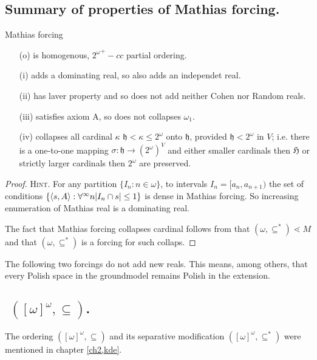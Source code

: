 \subsection{${}$Summary of properties of Mathias forcing.}

Mathias forcing
\begin{itemize}
 \item[(o)] is homogenous, ${2^\omega}^+-cc$ partial ordering.
 \item[(i)] adds a dominating real, so also adds an independet real.
 \item[(ii)] has laver property and so does not add neither Cohen
	nor Random reals.
 \item[(iii)] satisfies axiom A, so does not collapses $\omega_1$.
 \item[(iv)] collapses all cardinal $\kappa$ $\mathfrak h < \kappa \leq 2^\omega$
	onto $\mathfrak h$, provided $\mathfrak h < 2^\omega$ in $V$;
	i.e. there is a one-to-one mapping $\sigma: \mathfrak h \to (2^\omega)^V$
	and either smaller cardinals then $\mathfrak H$ or strictly
	larger cardinals then $2^\omega$ are preserved.
\end{itemize}

\begin{proof} {\scshape Hint.} For any  partition $\{I_n : n \in \omega \}$, to
intervals $I_n = [a_n , a_{n+1} )$ the set of conditions $\{ \langle s, A \rangle : \forall^\infty n |I_n \cap s| \leq 1 \}$
is dense in Mathias forcing. So increasing enumeration of Mathias real is
a dominating real.

\smallskip

The fact that Mathias forcing collapses cardinal follows from that $(\omega,\subseteq^*) \lessdot M$
and that $(\omega,\subseteq^*)$ is a forcing for such collaps.

\end{proof}



The following two forcings do not add new reals. This means, among others,
that every Polish space in the groundmodel remains Polish in the extension.

\subsection{${}$ $([\omega]^\omega,\subseteq)$.}

The ordering $([\omega]^\omega,\subseteq)$ and its separative modification
$([\omega]^\omega,\subseteq^*)$ were mentioned in chapter \ref{ch2,kde}.

